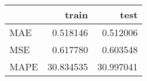 \begin{tabular}{lrr}
\toprule
{} &      train &       test \\
\midrule
MAE  &   0.518146 &   0.512006 \\
MSE  &   0.617780 &   0.603548 \\
MAPE &  30.834535 &  30.997041 \\
\bottomrule
\end{tabular}
